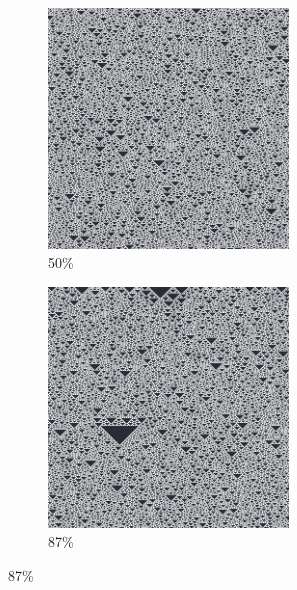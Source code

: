 \documentclass[12pt, fleqn]{report}                             %
\theoremstyle{break}                                            %
\begin{document}
\begin{figure}[h!]
\begin{subfigure}[b]{0.4\linewidth}
            \includegraphics[width=0.7\textwidth]{Images/126/c.png}
            \caption{50\%}
          \end{subfigure}
          \begin{subfigure}[b]{0.4\linewidth}
            \includegraphics[width=0.7\textwidth]{Images/126/d.png}
            \caption{87\%}
          \end{subfigure}
        \end{figure}
\end{document}
